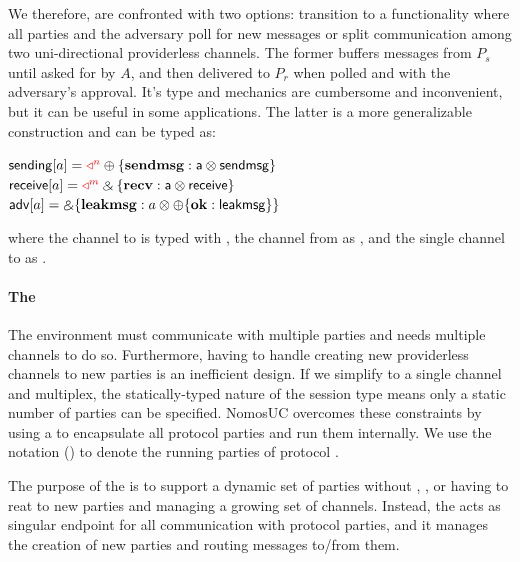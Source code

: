 We therefore, are confronted with two options: transition to a functionality where all parties and the adversary poll for new messages or split communication among two uni-directional providerless channels.
The former buffers messages from $P_s$ until asked for by $A$, and then delivered to $P_r$ when polled and with the adversary's approval.
It's type and mechanics are cumbersome and inconvenient, but it can be useful in some applications.
The latter is a more generalizable construction and can be typed as: 
\begin{center}
\parbox{0cm}{
\begin{tabbing}
$\mathsf{sending}[a] = \textcolor{red}{\triangleleft^n} \oplus \{ \mathbf{sendmsg}: \mathsf{a} \otimes \mathsf{sendmsg} \}$ \\
$\mathsf{receive}[a] = \textcolor{red}{\triangleleft^m} \mathbin{\binampersand} \{ \mathbf{recv}: \mathsf{a} \otimes \mathsf{receive} \}$ \\
$\mathsf{adv}[a] = \mathbin{\binampersand} \{ \mathbf{leakmsg}: a \otimes \oplus \{  \mathbf{ok}: \mathsf{leakmsg} \} \}$
\end{tabbing}}
\end{center}
where the channel to \Fauth is typed with , the channel from \Fauth as , and the single channel to \A as .

\paragraph*{\textbf{The \partywrapper}}
The environment must communicate with multiple parties and needs multiple channels to do so. 
Furthermore, \Z having to handle creating new providerless channels to new parties is an inefficient design.
If we simplify to a single channel and multiplex, the statically-typed nature of the session type means only a static number of parties can be specified. 
NomosUC overcomes these constraints by using a \partywrapper to encapsulate all protocol parties and run them internally.
We use the notation (\PI) to denote the \partywrapper running parties of protocol \PI.

The purpose of the \partywrapper is to support a dynamic set of parties without \Z, \A, or \F having to reat to new parties and managing a growing set of channels.
Instead, the \partywrapper acts as singular endpoint for all communication with protocol parties, and it manages the creation of new parties and routing messages to/from them.

